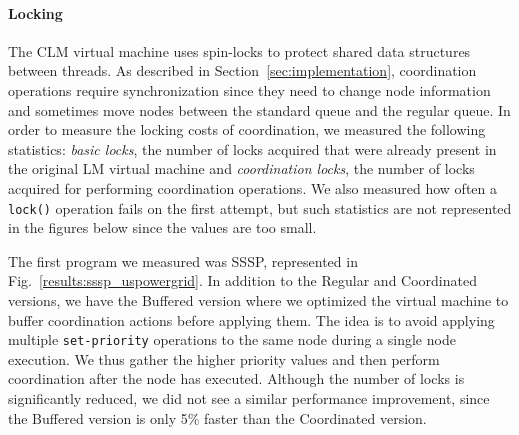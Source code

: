 \paragraph{Locking} The CLM virtual machine uses spin-locks to protect shared data structures between
threads. As described in Section~\ref{sec:implementation}, coordination
operations require synchronization since they need to change node information
and sometimes move nodes between the standard queue and the regular queue.
In order to measure the locking costs of coordination, we measured the following
statistics: \emph{basic locks}, the number of locks acquired that were already
present in the original LM virtual machine and \emph{coordination locks}, the
number of locks acquired for performing coordination operations. We also
measured how often a \texttt{lock()} operation fails on the first attempt, but
such statistics are not represented in the figures below since the values are
too small.

The first program we measured was SSSP, represented in
Fig.~\ref{results:sssp_uspowergrid}. In addition to the Regular and
Coordinated versions, we have the Buffered version where we
optimized the virtual machine to buffer coordination actions before applying
them. The idea is to avoid applying multiple \texttt{set-priority} operations to
the same node during a single node execution. We thus gather the higher priority
values and then perform coordination after the node has executed.
Although the number of locks is significantly reduced, we did not see a
similar performance improvement, since the Buffered version is only
5\% faster than the Coordinated version.

\begin{topfig}
   \begin{center}
   \end{center}
\end{topfig}

